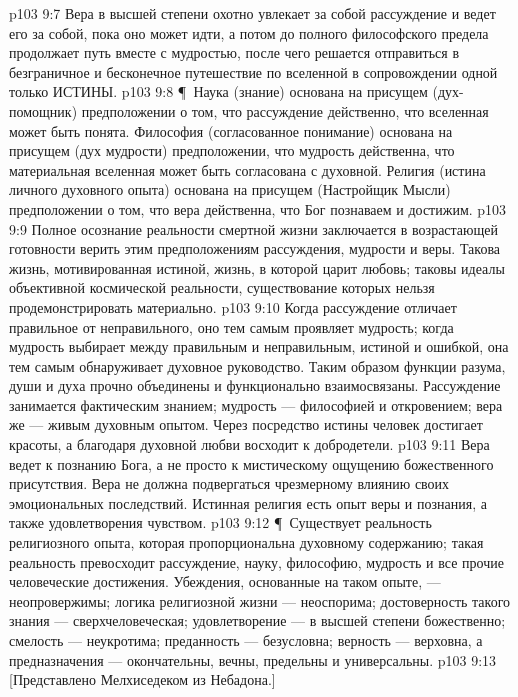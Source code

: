 \vs p103 9:7 Вера в высшей степени охотно увлекает за собой рассуждение и ведет его за собой, пока оно может идти, а потом до полного философского предела продолжает путь вместе с мудростью, после чего решается отправиться в безграничное и бесконечное путешествие по вселенной в сопровождении одной только ИСТИНЫ.
\vs p103 9:8 \P\ Наука (знание) основана на присущем (дух\hyp{}помощник) предположении о том, что рассуждение действенно, что вселенная может быть понята. Философия (согласованное понимание) основана на присущем (дух мудрости) предположении, что мудрость действенна, что материальная вселенная может быть согласована с духовной. Религия (истина личного духовного опыта) основана на присущем (Настройщик Мысли) предположении о том, что вера действенна, что Бог познаваем и достижим.
\vs p103 9:9 Полное осознание реальности смертной жизни заключается в возрастающей готовности верить этим предположениям рассуждения, мудрости и веры. Такова жизнь, мотивированная истиной, жизнь, в которой царит любовь; таковы идеалы объективной космической реальности, существование которых нельзя продемонстрировать материально.
\vs p103 9:10 Когда рассуждение отличает правильное от неправильного, оно тем самым проявляет мудрость; когда мудрость выбирает между правильным и неправильным, истиной и ошибкой, она тем самым обнаруживает духовное руководство. Таким образом функции разума, души и духа прочно объединены и функционально взаимосвязаны. Рассуждение занимается фактическим знанием; мудрость --- философией и откровением; вера же --- живым духовным опытом. Через посредство истины человек достигает красоты, а благодаря духовной любви восходит к добродетели.
\vs p103 9:11 Вера ведет к познанию Бога, а не просто к мистическому ощущению божественного присутствия. Вера не должна подвергаться чрезмерному влиянию своих эмоциональных последствий. Истинная религия есть опыт веры и познания, а также удовлетворения чувством.
\vs p103 9:12 \P\ Существует реальность религиозного опыта, которая пропорциональна духовному содержанию; такая реальность превосходит рассуждение, науку, философию, мудрость и все прочие человеческие достижения. Убеждения, основанные на таком опыте, --- неопровержимы; логика религиозной жизни --- неоспорима; достоверность такого знания --- сверхчеловеческая; удовлетворение --- в высшей степени божественно; смелость --- неукротима; преданность --- безусловна; верность --- верховна, а предназначения --- окончательны, вечны, предельны и универсальны.
\vs p103 9:13 [Представлено Мелхиседеком из Небадона.]

